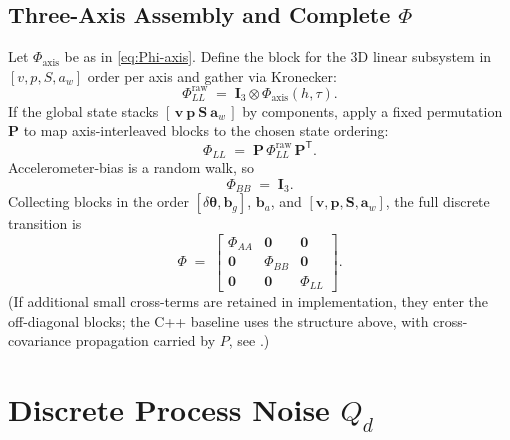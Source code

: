 \documentclass[11pt]{article}
\newcommand{\vect}[1]{\bm{#1}}
\newcommand{\mat}[1]{\bm{#1}}
\newcommand{\T}{\mathsf{T}}
\newcommand{\I}{\mat{I}}
\begin{document}
\subsection{Three-Axis Assembly and Complete \texorpdfstring{$\Phi$}{Phi}}
Let \(\Phi_{\mathrm{axis}}\) be as in \eqref{eq:Phi-axis}. Define the block
for the 3D linear subsystem in \([v,p,S,a_w]\) order per axis and gather via
Kronecker:
\begin{equation}
  \Phi_{LL}^{\mathrm{raw}} \;=\; \I_3 \otimes \Phi_{\mathrm{axis}}(h,\tau).
  \label{eq:PhiLL-raw}
\end{equation}
If the global state stacks \([\,\vect{v}~\vect{p}~\vect{S}~\vect{a}_w\,]\) by components,
apply a fixed permutation \(\mat{P}\) to map axis-interleaved blocks to the chosen
state ordering:
\begin{equation}
  \Phi_{LL} \;=\; \mat{P}\, \Phi_{LL}^{\mathrm{raw}} \, \mat{P}^{\T}.
  \label{eq:PhiLL}
\end{equation}
Accelerometer-bias is a random walk, so
\begin{equation}
  \Phi_{BB} \;=\; \I_3.
  \label{eq:PhiBB}
\end{equation}
Collecting blocks in the order \([\delta\vect{\theta},\vect{b}_g]\), \(\vect{b}_a\), and
\([\vect{v},\vect{p},\vect{S},\vect{a}_w]\), the full discrete transition is
\begin{equation}
  \Phi \;=\;
  \begin{bmatrix}
    \Phi_{AA} & \mat{0} & \mat{0} \\
    \mat{0}   & \Phi_{BB} & \mat{0} \\
    \mat{0}   & \mat{0}   & \Phi_{LL}
  \end{bmatrix}.
  \label{eq:Phi-full}
\end{equation}
(If additional small cross-terms are retained in implementation, they enter the
off-diagonal blocks; the C++ baseline uses the structure above, with cross-covariance
propagation carried by \(P\), see .)

\section{Discrete Process Noise \texorpdfstring{$Q_d$}{Qd}}
\label{sec:Qd}
\end{document}
